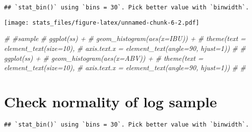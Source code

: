 \documentclass[]{article}
\newenvironment{Shaded}{\begin{snugshade}}{\end{snugshade}}
\newcommand{\KeywordTok}[1]{\textcolor[rgb]{0.13,0.29,0.53}{\textbf{#1}}}
\newcommand{\DataTypeTok}[1]{\textcolor[rgb]{0.13,0.29,0.53}{#1}}
\newcommand{\DecValTok}[1]{\textcolor[rgb]{0.00,0.00,0.81}{#1}}
\newcommand{\StringTok}[1]{\textcolor[rgb]{0.31,0.60,0.02}{#1}}
\newcommand{\CommentTok}[1]{\textcolor[rgb]{0.56,0.35,0.01}{\textit{#1}}}
\newcommand{\OperatorTok}[1]{\textcolor[rgb]{0.81,0.36,0.00}{\textbf{#1}}}
\newcommand{\NormalTok}[1]{#1}
\begin{document}
\begin{verbatim}
## `stat_bin()` using `bins = 30`. Pick better value with `binwidth`.
\end{verbatim}

\texttt{[image: stats\_files/figure-latex/unnamed-chunk-6-2.pdf]}

\begin{Shaded}
\begin{Highlighting}[]
\CommentTok{# #sample}
\CommentTok{# ggplot(ss) +}
\CommentTok{#     geom_histogram(aes(x=IBU)) +}
\CommentTok{#     theme(text = element_text(size=10),}
\CommentTok{#         axis.text.x = element_text(angle=90, hjust=1)) }
\CommentTok{# }
\CommentTok{# ggplot(ss) +}
\CommentTok{#     geom_histogram(aes(x=ABV)) +}
\CommentTok{#     theme(text = element_text(size=10),}
\CommentTok{#         axis.text.x = element_text(angle=90, hjust=1)) }
\CommentTok{# }
\CommentTok{# }
\end{Highlighting}
\end{Shaded}

\section{Check normality of log
sample}\label{check-normality-of-log-sample}

\begin{Shaded}
\end{Shaded}

\begin{verbatim}
## `stat_bin()` using `bins = 30`. Pick better value with `binwidth`.
\end{verbatim}
\end{document}
